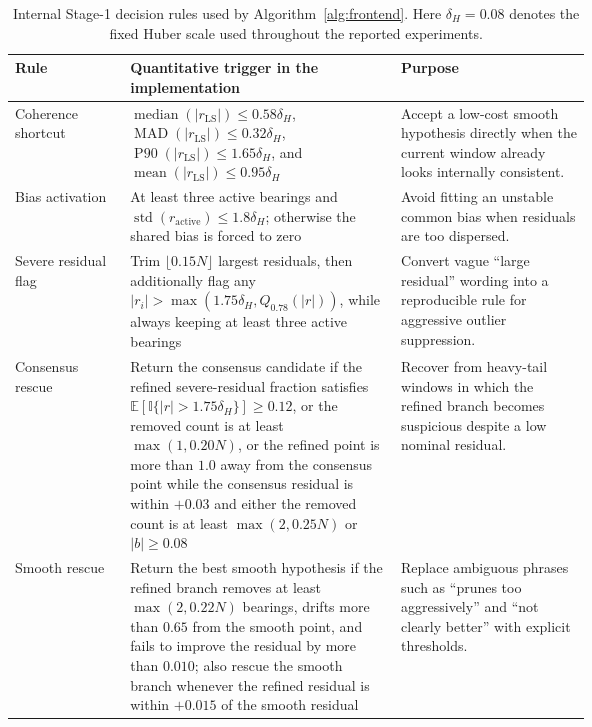 \begin{table}[!htbp]
\centering
\caption{Internal Stage-1 decision rules used by Algorithm~\ref{alg:frontend}. Here $\delta_H=0.08$ denotes the fixed Huber scale used throughout the reported experiments.}
\label{tab:stagerules}
\small
\begin{tabularx}{\linewidth}{>{\RaggedRight\arraybackslash}p{0.20\linewidth} >{\RaggedRight\arraybackslash}p{0.47\linewidth} >{\RaggedRight\arraybackslash}X}
\toprule
Rule & Quantitative trigger in the implementation & Purpose \\
\midrule
Coherence shortcut & $\operatorname{median}(|r_{\mathrm{LS}}|)\le 0.58\delta_H$, $\operatorname{MAD}(|r_{\mathrm{LS}}|)\le 0.32\delta_H$, $\operatorname{P90}(|r_{\mathrm{LS}}|)\le 1.65\delta_H$, and $\operatorname{mean}(|r_{\mathrm{LS}}|)\le 0.95\delta_H$ & Accept a low-cost smooth hypothesis directly when the current window already looks internally consistent. \\
Bias activation & At least three active bearings and $\operatorname{std}(r_{\mathrm{active}})\le 1.8\delta_H$; otherwise the shared bias is forced to zero & Avoid fitting an unstable common bias when residuals are too dispersed. \\
Severe residual flag & Trim $\lfloor 0.15N\rfloor$ largest residuals, then additionally flag any $|r_i|>\max(1.75\delta_H,Q_{0.78}(|r|))$, while always keeping at least three active bearings & Convert vague ``large residual'' wording into a reproducible rule for aggressive outlier suppression. \\
Consensus rescue & Return the consensus candidate if the refined severe-residual fraction satisfies $\mathbb{E}[\mathbb{I}\{|r|>1.75\delta_H\}]\ge 0.12$, or the removed count is at least $\max(1,0.20N)$, or the refined point is more than $1.0$ away from the consensus point while the consensus residual is within $+0.03$ and either the removed count is at least $\max(2,0.25N)$ or $|b|\ge 0.08$ & Recover from heavy-tail windows in which the refined branch becomes suspicious despite a low nominal residual. \\
Smooth rescue & Return the best smooth hypothesis if the refined branch removes at least $\max(2,0.22N)$ bearings, drifts more than $0.65$ from the smooth point, and fails to improve the residual by more than $0.010$; also rescue the smooth branch whenever the refined residual is within $+0.015$ of the smooth residual & Replace ambiguous phrases such as ``prunes too aggressively'' and ``not clearly better'' with explicit thresholds. \\
\bottomrule
\end{tabularx}
\end{table}
